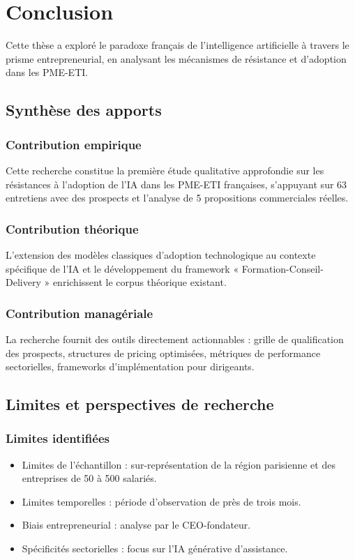 \chapter{Conclusion}
\label{chap:conclusion}

Cette thèse a exploré le paradoxe français de l'intelligence artificielle à travers le prisme entrepreneurial, en analysant les mécanismes de résistance et d'adoption dans les PME-ETI.

\section{Synthèse des apports}

\subsection{Contribution empirique}
Cette recherche constitue la première étude qualitative approfondie sur les résistances à l'adoption de l'IA dans les PME-ETI françaises, s'appuyant sur 63 entretiens avec des prospects et l'analyse de 5 propositions commerciales réelles.

\subsection{Contribution théorique}
L'extension des modèles classiques d'adoption technologique au contexte spécifique de l'IA et le développement du framework « Formation-Conseil-Delivery » enrichissent le corpus théorique existant.

\subsection{Contribution managériale}
La recherche fournit des outils directement actionnables : grille de qualification des prospects, structures de pricing optimisées, métriques de performance sectorielles, frameworks d'implémentation pour dirigeants.

\section{Limites et perspectives de recherche}

\subsection{Limites identifiées}
\begin{itemize}
    \item Limites de l'échantillon : sur-représentation de la région parisienne et des entreprises de 50 à 500 salariés.
    \item Limites temporelles : période d'observation de près de trois mois.
    \item Biais entrepreneurial : analyse par le CEO-fondateur.
    \item Spécificités sectorielles : focus sur l'IA générative d'assistance.
\end{itemize}

